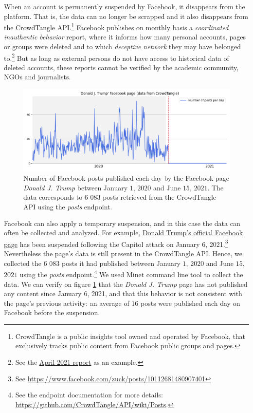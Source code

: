 \documentclass{article}
\begin{document}
When an account is permanently suspended by Facebook, it disappears from the platform. That is,  the data can no longer be scrapped and it also disappears from the CrowdTangle API.\footnote{CrowdTangle is a public insights tool owned and operated by Facebook, that exclusively tracks public content from Facebook public groups and pages.} Facebook publishes on monthly basis a {\it coordinated inauthentic behavior} report, where it informs how many personal accounts, pages or groups were deleted and to which {\it deceptive network} they may have belonged to.\footnote{See the \href{https://about.fb.com/news/2021/05/april-2021-coordinated-inauthentic-behavior-report/}{April 2021 report} as an example.} 
But as long as external persons do not have access to historical data of deleted accounts, these reports cannot be verified by the academic community, NGOs and journalists.

\begin{figure}[h]
	\centering
			\includegraphics[scale=0.4]{../figure/facebook_crowdtangle_trump.png}
	\caption{Number of Facebook posts published each day by the Facebook page {\it Donald J. Trump} between January $1$, $2020$ and June $15$, $2021$. The data corresponds to $6$ $083$ posts retrieved from the CrowdTangle API using the {\it posts} endpoint.}
	\label{fig1_fb}
\end{figure}

Facebook can also apply a temporary suspension, and in this case the data can often be collected and analyzed. For example, \href{https://www.facebook.com/DonaldTrump/}{Donald Trump’s official Facebook page}  has been suspended following the Capitol attack on January 6, 2021.\footnote{See \href{https://www.facebook.com/zuck/posts/10112681480907401}{https://www.facebook.com/zuck/posts/10112681480907401}} Nevertheless the page’s data is still present in the CrowdTangle API. 
Hence, we collected the $6$ $083$ posts it had published between January $1$, $2020$ and June $15$, $2021$ using the {\it posts} endpoint.\footnote{See the endpoint documentation for more details: \href{https://github.com/CrowdTangle/API/wiki/Posts}{https://github.com/CrowdTangle/API/wiki/Posts}.} We used Minet command line tool \cite{minet} to collect the data. We can verify on figure \ref{fig1_fb} that the {\it Donald J. Trump} page has not published any content since January $6$, 2021, and that this behavior is not consistent with the page’s previous activity: an average of $16$ posts were published each day on Facebook before the suspension. 
\end{document}
